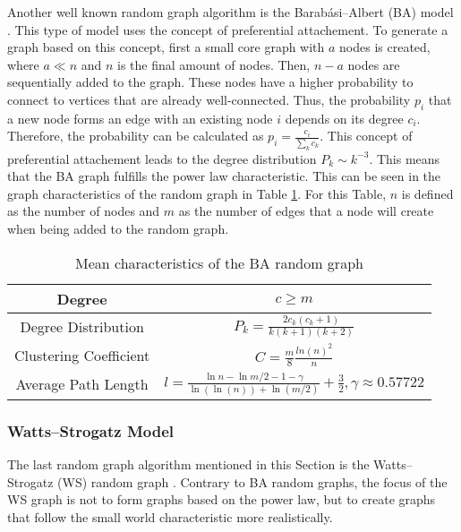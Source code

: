 Another well known random graph algorithm is the Barabási–Albert (BA) model 
\cite{barabasimodel}. 
This type of model uses the concept of preferential attachement.
To generate a graph based on this concept, first a small \glqq core\grqq{}
graph with $a$ nodes is created, where $a\ll n$ and $n$ is the final amount of nodes.
Then, $n-a$ nodes are sequentially added to the graph.
These nodes have a higher 
probability to connect to vertices that are already well-connected. 
Thus, the probability $p_i$ that a new node forms an edge with an
existing node $i$ depends on its degree $c_i$. Therefore, the
probability can be calculated as $p_i= \frac{c_i}{\sum_{k}c_k}$.
This concept of preferential attachement leads to the degree distribution
$P_k\sim k^{-3}$. This means that the BA graph 
fulfills the power law characteristic.
This can be seen in the graph characteristics of the random graph
in Table \ref{ba-model}. For this Table, $n$ is defined as the number
of nodes and $m$ as the number of edges that a node
will create when being added to the random graph.

\begin{table}[ht!]
    \centering
    \begin{tabular}{|c | c |} 
     \hline
     Degree & $c\geq m$ \\ 
     \hline
     Degree Distribution & 
     $P_k = \frac{2c_k(c_k+1)}{k(k+1)(k+2)}$ \\ 
     \hline
     Clustering Coefficient \cite{ba_cluster_coeff} & 
     $C=\frac{m}{8}\frac{ln(n)^2}{n}$ \\ 
     \hline
     Average Path Length \cite{averagepath}& 
     $l = \frac{\ln{n}- \ln{m/2} - 1 - \gamma}{\ln(\ln(n))+\ln{(m/2)}} + \frac{3}{2}, 
     \gamma \approx 0.57722$ \\ 
     \hline
    \end{tabular}
    \caption{Mean characteristics of the BA random graph \cite{basicnetwork}}
    \label{ba-model}
\end{table}

\subsubsection{Watts–Strogatz Model}
The last random graph algorithm mentioned in this Section 
is the Watts–Strogatz (WS) random graph \cite{wattsmodel}.
Contrary to BA random graphs, the focus of the WS graph is not to 
form graphs based on the power law, but to create graphs
that follow the small world characteristic more realistically.

